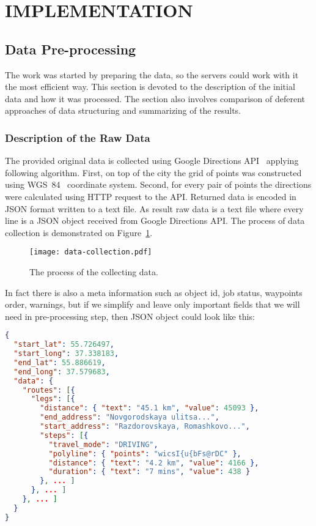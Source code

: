 
\section{IMPLEMENTATION}

\subsection{Data Pre-processing}

The work was started by preparing the data, so the servers could work with it the most efficient
way. This section is devoted to the description of the initial data and how it was processed. The
section also involves comparison of deferent approaches of data structuring
and summarizing of the results.

\subsubsection{Description of the Raw Data}

The provided original data is collected using Google
Directions API~\cite{google:directions} applying following algorithm. First, on top of the city the
grid of points was constructed using WGS~84~\cite{wiki:wgs} coordinate system. Second, for every
pair of points the directions were calculated using HTTP request to the API. Returned data is
encoded in JSON format written to a text file. As result raw data is a text file where every line is
a JSON object received from Google Directions API. The process of data collection is demonstrated on
Figure~\ref{pic:collecting_data}.

\begin{figure}[ht]
  \centering
  \texttt{[image: data-collection.pdf]}
  \caption{The process of the collecting data.}
  \label{pic:collecting_data}
\end{figure}

In fact there is also a meta information such as object id, job status, waypoints order,
warnings, but if we simplify and leave only important fields that we will need in pre-processing
step, then JSON object could look like this:

\begin{lstlisting}[language=json, caption=Google Directions API simplified response example,
      label={lst:google_response}]
{
  "start_lat": 55.726497,
  "start_long": 37.338183,
  "end_lat": 55.886619,
  "end_long": 37.579683,
  "data": {
    "routes": [{
      "legs": [{
        "distance": { "text": "45.1 km", "value": 45093 },
        "end_address": "Novgorodskaya ulitsa...",
        "start_address": "Razdorovskaya, Romashkovo...",
        "steps": [{
          "travel_mode": "DRIVING",
          "polyline": { "points": "wicsI{u{bFs@rDC" },
          "distance": { "text": "4.2 km", "value": 4166 },
          "duration": { "text": "7 mins", "value": 438 }
        }, ... ]
      }, ... ]
    }, ... ]
  }
}
\end{lstlisting}

